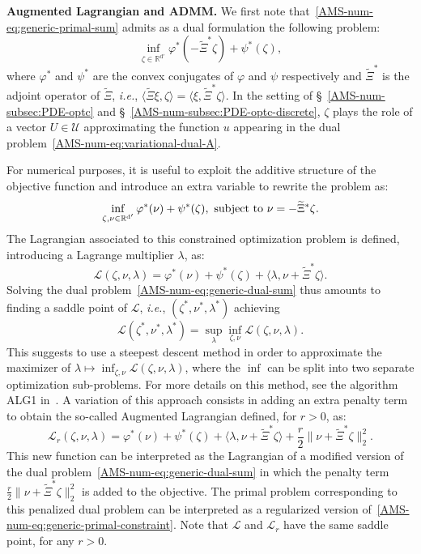 \documentclass{amsproc}
\theoremstyle{definition}
\theoremstyle{remark}
\numberwithin{equation}{section}
\newcommand{\RR}{{\mathbb R}}
\newcommand{\cL}{{\mathcal L}}
\newcommand{\cU}{{\mathcal U}}
\begin{document}
\textbf{Augmented Lagrangian and ADMM.} We first note that~\eqref{AMS-num-eq:generic-primal-sum} admits as a dual formulation the following problem:
\begin{equation}
\label{AMS-num-eq:generic-dual-sum}
	\inf_{\zeta \in \RR^{\mathrm{d}'}} \varphi^*(- \widetilde{\Xi}^* \zeta) + \psi^*(\zeta), 
\end{equation}
where $\varphi^*$ and $\psi^*$ are the convex conjugates of $\varphi$ and $\psi$ respectively and $\widetilde{\Xi}^*$ is the adjoint operator of $\widetilde\Xi$, \textit{i.e.}, $\langle \widetilde{\Xi} \xi, \zeta \rangle =  \langle \xi, \widetilde{\Xi}^* \zeta \rangle$. In the setting of \S~\ref{AMS-num-subsec:PDE-optc} and \S~\ref{AMS-num-subsec:PDE-optc-discrete}, $\zeta$ plays the role of a vector $U\in\cU$ approximating the function $u$ appearing in the dual problem~\eqref{AMS-num-eq:variational-dual-A}.


For numerical purposes, it is useful to exploit the additive structure of the objective function and introduce an extra variable  to rewrite the problem as:
\begin{equation*}
	\inf_{\zeta, \nu \in \RR^{\mathrm{d}'}} \varphi^*(\nu) + \psi^*(\zeta), \hbox{ subject to } \nu = - \widetilde{\Xi}^* \zeta.
\end{equation*}
The Lagrangian associated to this constrained optimization problem is defined, introducing a Lagrange multiplier $\lambda$, as:
\begin{equation*}
	\cL(\zeta, \nu, \lambda) = \varphi^*(\nu) + \psi^*(\zeta) + \langle \lambda , \nu + \widetilde{\Xi}^* \zeta \rangle .
\end{equation*}
Solving the dual problem~\eqref{AMS-num-eq:generic-dual-sum} thus amounts to finding a saddle point of $\cL$, \textit{i.e.}, $(\zeta^*, \nu^*, \lambda^*)$ achieving
\begin{equation}
\label{AMS-num-eq:generic-LagSaddlePoint}
	\cL(\zeta^*, \nu^*, \lambda^*) = \sup_{\lambda} \inf_{\zeta, \nu} \cL(\zeta, \nu, \lambda).
\end{equation}
This suggests to use a steepest descent method in order to approximate the maximizer of $\lambda \mapsto \inf_{\zeta, \nu} \cL(\zeta, \nu, \lambda)$, where the $\inf$ can be split into two separate optimization sub-problems. For more details on this method, see the algorithm ALG1 in~\cite[Chapter 3]{MR724072}. A variation of this approach consists in adding an extra penalty term to obtain the so-called Augmented Lagrangian defined, for $r>0$, as:
$$
	\cL_r(\zeta, \nu, \lambda) = \varphi^*(\nu) + \psi^*(\zeta) + \langle \lambda , \nu + \widetilde{\Xi}^* \zeta \rangle  + \frac{r}{2} \|\nu + \widetilde{\Xi}^* \zeta \|_2^2.
$$
This new function can be interpreted as the Lagrangian of a modified version of the dual problem~\eqref{AMS-num-eq:generic-dual-sum} in which the penalty term $\frac{r}{2} \|\nu + \widetilde{\Xi}^* \zeta \|_2^2$ is added to the objective. The primal problem corresponding to this penalized dual problem can be interpreted as a regularized version of~\eqref{AMS-num-eq:generic-primal-constraint}.  Note that $\cL$ and $\cL_r$ have the same saddle point, for any $r>0$.
\end{document}
